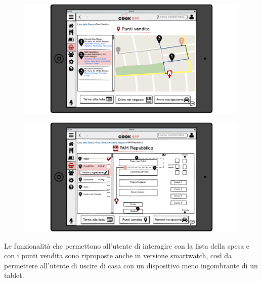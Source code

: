 \begin{itemize}
\begin{figure}[H]
	\centering
	\includegraphics[width=0.95\linewidth]{img/mockup/punti-vendita.png}
\end{figure}
\begin{figure}[H]
	\centering
	\includegraphics[width=0.95\linewidth]{img/mockup/punti-vendita-2.png}
\end{figure}

Le funzionalità che permettono all'utente di interagire con la lista
della spesa e con i punti vendita sono riproposte anche in versione
smartwatch, così da permettere all'utente di uscire di casa con un
dispositivo meno ingombrante di un tablet.


\end{itemize}
